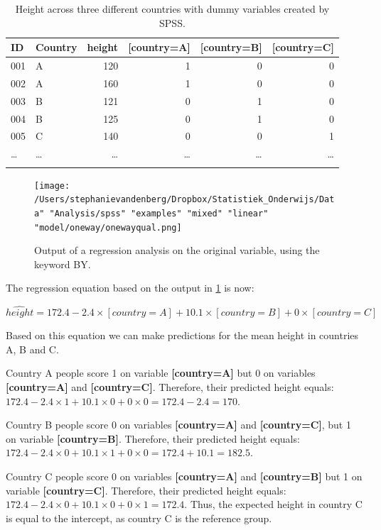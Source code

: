\documentclass[]{book}\usepackage[]{graphicx}\usepackage[]{color}
\begin{document}
\begin{table}
 \caption{Height across three different countries with dummy variables created by SPSS.}
 \begin{tabular}{llrrrr}
 ID & Country &  height & [country=A] & [country=B] & [country=C]\\ \hline
  001 &A & 120 & 1 & 0&0\\
  002 &A & 160 & 1 & 0&0\\
  003 &B & 121 & 0 & 1&0\\
  004 &B & 125 & 0 & 1&0\\
  005 &C & 140 & 0 & 0&1\\
  \dots & \dots & \dots& \dots & \dots&\dots\\
  \label{tab:dummy_spss}
 \end{tabular}
 \end{table}


\begin{figure}[h]
    \begin{center}
       \texttt{[image: /Users/stephanievandenberg/Dropbox/Statistiek\_Onderwijs/Data" "Analysis/spss" "examples" "mixed" "linear" "model/oneway/onewayqual.png]}
    \end{center}
    \caption{Output of a regression analysis on the original variable, using the keyword BY.}
    \label{fig:dummy_22}
\end{figure}

The regression equation based on the output in \ref{fig:dummy_22} is now:

\begin{equation}
\widehat{height} = 172.4 - 2.4 \times [country=A] + 10.1 \times [country=B] + 0 \times [country=C]
\end{equation}

Based on this equation we can make predictions for the mean height in countries A, B and C. 

Country A people score 1 on variable \textbf{[country=A]} but 0 on variables \textbf{[country=A]} and \textbf{[country=C]}. Therefore, their predicted height equals: $172.4 - 2.4 \times 1 + 10.1 \times 0 + 0 \times 0 =  172.4 - 2.4 = 170$.

Country B people score 0 on variables \textbf{[country=A]} and \textbf{[country=C]}, but 1 on variable \textbf{[country=B]}. Therefore, their predicted height equals: $172.4 - 2.4 \times 0 + 10.1 \times 1 + 0 \times 0 =  172.4 + 10.1 = 182.5$.

Country C people score 0 on variables \textbf{[country=A]} and \textbf{[country=B]} but 1 on variable \textbf{[country=C]}. Therefore, their predicted height equals: $172.4 - 2.4 \times 0 + 10.1 \times 0 + 0 \times 1 =  172.4$. Thus, the expected height in country C is equal to the intercept, as country C is the reference group. 
\end{document}
